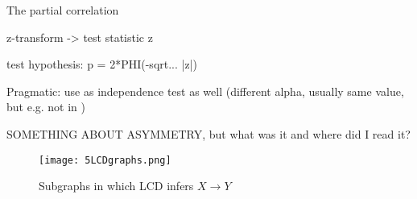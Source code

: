 The partial correlation 

z-transform -> test statistic z

test hypothesis: p = 2*PHI(-sqrt... |z|)

Pragmatic: use as independence test as well (different alpha, usually same value, but e.g. not in \citet{triantafillou2017predicting})


SOMETHING ABOUT ASYMMETRY, but what was it and where did I read it?




\begin{figure}[]
    \centering
    \texttt{[image: 5LCDgraphs.png]}
    \caption{Subgraphs in which LCD infers $X\to Y$}
    \label{fig:5:lcdgraphs}
\end{figure}